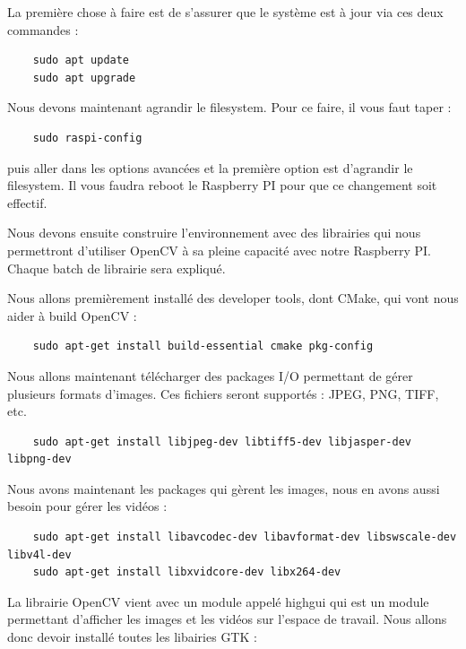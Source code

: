 \documentclass[
	a4paper,									%
	11pt,										%
	twoside,									%
	openright,									%
	notitlepage,									%
	parskip=half,								%
]{scrreprt}										%
\begin{document}
La première chose à faire est de s'assurer que le système est à jour via ces deux commandes : 

\begin{verbatim}
	sudo apt update
	sudo apt upgrade
\end{verbatim}

Nous devons maintenant agrandir le filesystem. Pour ce faire, il vous faut taper : 

\begin{verbatim}
	sudo raspi-config
\end{verbatim}

\noindent puis aller dans les options avancées et la première option est d'agrandir le filesystem. 
Il vous faudra reboot le Raspberry PI pour que ce changement soit effectif.

Nous devons ensuite construire l'environnement avec des librairies qui nous permettront d'utiliser
OpenCV à sa pleine capacité avec notre Raspberry PI. Chaque batch de librairie sera expliqué. \par

Nous allons premièrement installé des developer tools, dont CMake, qui vont nous aider à build OpenCV : 

\begin{verbatim}
	sudo apt-get install build-essential cmake pkg-config
\end{verbatim}

Nous allons maintenant télécharger des packages I/O  permettant de gérer plusieurs formats d'images. Ces 
fichiers seront supportés : JPEG, PNG, TIFF, etc. 

\begin{verbatim}
	sudo apt-get install libjpeg-dev libtiff5-dev libjasper-dev libpng-dev
\end{verbatim}

Nous avons maintenant les packages qui gèrent les images, nous en avons aussi besoin pour gérer les vidéos : 

\begin{verbatim}
	sudo apt-get install libavcodec-dev libavformat-dev libswscale-dev libv4l-dev
	sudo apt-get install libxvidcore-dev libx264-dev
\end{verbatim}

La librairie OpenCV vient avec un module appelé highgui qui est un module permettant d'afficher les images et 
les vidéos sur l'espace de travail. Nous allons donc devoir installé toutes les libairies GTK : 
\end{document}
